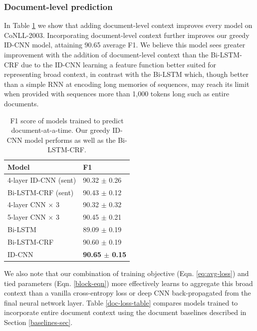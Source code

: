 \subsubsection{Document-level prediction}

In Table \ref{doc-summary-table} we show that adding document-level context improves every model on CoNLL-2003. Incorporating document-level context further improves our greedy ID-CNN model, attaining 90.65 average F1. We believe this model sees greater improvement with the addition of document-level context than the Bi-LSTM-CRF due to the ID-CNN learning a feature function better suited for representing broad context, in contrast with the Bi-LSTM which, though better than a simple RNN at encoding long memories of sequences, may reach its limit when provided with sequences more than 1,000 tokens long such as entire documents.

\begin{table}
\begin{tabular}{ll}
    Model & F1 \\ \hline \hline
    4-layer ID-CNN (sent) & 90.32 $\pm$ 0.26 \\ %
    Bi-LSTM-CRF (sent) & 90.43 $\pm$ 0.12 \\ \hline %
    4-layer CNN $\times$ 3 & 90.32 $\pm$ 0.32 \\ %
    5-layer CNN $\times$ 3 & 90.45 $\pm$ 0.21 \\ %
    Bi-LSTM & 89.09 $\pm$ 0.19 \\ %
    Bi-LSTM-CRF & 90.60 $\pm$ 0.19 \\ %
    ID-CNN & {\bf 90.65 $\pm$ 0.15} \\ %
  \end{tabular}
  \caption{F1 score of models trained to predict document-at-a-time. Our greedy ID-CNN model performs as well as the Bi-LSTM-CRF.\label{doc-summary-table}}
\end{table}

We also note that our combination of training objective (Eqn. \ref{eq:avg-loss}) and tied parameters (Eqn. \ref{block-eqn}) more effectively learns to aggregate this broad context than a vanilla cross-entropy loss or deep CNN back-propagated from the final neural network layer. Table \ref{doc-loss-table} compares models trained to incorporate entire document context using the document baselines described in Section \ref{baselines-sec}.

